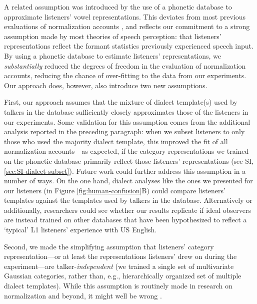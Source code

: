\documentclass[preprint]{JASA}
\begin{document}
A related assumption was introduced by the use of a phonetic database to approximate listeners' vowel representations. This deviates from most previous evaluations of normalization accounts \citetext{\citealp{mcmurray-jongman2011}; \citealp{barreda2021}; \citealp[but see][]{richter2017}}, and reflects our commitment to a strong assumption made by most theories of speech perception: that listeners' representations reflect the formant statistics previously experienced speech input. By using a phonetic database to estimate listeners' representations, we \emph{substantially} reduced the degrees of freedom in the evaluation of normalization accounts, reducing the chance of over-fitting to the data from our experiments. Our approach does, however, also introduce two new assumptions.

First, our approach assumes that the mixture of dialect template(s) used by talkers in the database sufficiently closely approximates those of the listeners in our experiments. Some validation for this assumption comes from the additional analysis reported in the preceding paragraph: when we subset listeners to only those who used the majority dialect template, this improved the fit of all normalization accounts---as expected, if the category representations we trained on the phonetic database primarily reflect those listeners' representations (see SI, \ref{sec:SI-dialect-subset}). Future work could further address this assumption in a number of ways. On the one hand, dialect analyses like the ones we presented for our listeners (in Figure \ref{fig:human-confusion}B) could compare listeners' templates against the templates used by talkers in the database. Alternatively or additionally, researchers could see whether our results replicate if ideal observers are instead trained on other databases that have been hypothesized to reflect a `typical' L1 listeners' experience with US English.

Second, we made the simplifying assumption that listeners' category representation---or at least the representations listeners' drew on during the experiment---are talker-\emph{independent} (we trained a single set of multivariate Gaussian categories, rather than, e.g., hierarchically organized set of multiple dialect templates). While this assumption is routinely made in research on normalization and beyond, it might well be wrong \citep[see e.g.,][]{xie2021}.
\end{document}
